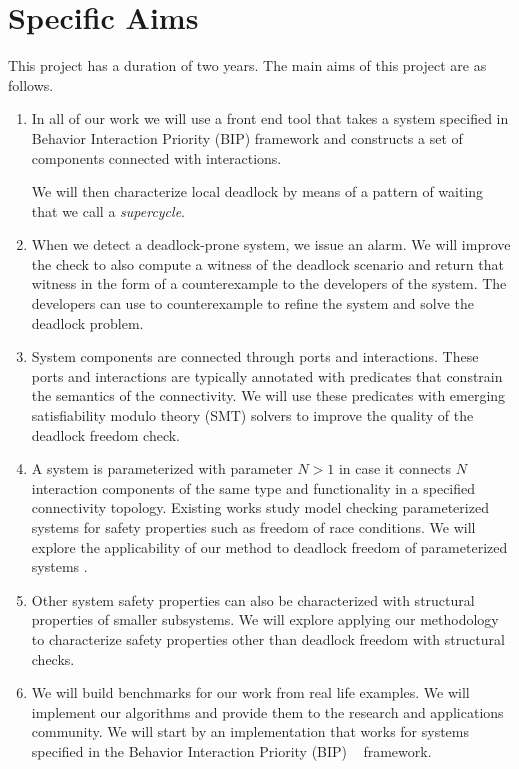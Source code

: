 \section{Specific Aims}
\label{sec:aims}

This project has a duration of two years.
The main aims of this project are as follows.

\begin{enumerate}

\item 
In all of our work we will use a front end tool that
takes a system specified in Behavior Interaction Priority (BIP)
framework and constructs a set of components connected 
with interactions. 



 We will then characterize local deadlock by
means of a pattern of waiting that we call a \emph{supercycle}.


\item 
When we detect a deadlock-prone system, we issue an alarm. 
We will improve the check to also compute a witness of the deadlock scenario 
and return that witness in the form of a counterexample 
to the developers of the system. 
The developers can use to counterexample to refine the system and solve
the deadlock problem. 

\item 
System components are connected through ports and interactions. 
These ports and interactions are typically annotated with predicates
that constrain the semantics of the connectivity. 
We will use these predicates with emerging satisfiability modulo theory (SMT) 
solvers to improve the quality of the deadlock freedom check.

		
\item 
A system is parameterized with parameter $N>1$ 
in case it connects $N$ interaction components of the 
same type and functionality in a specified connectivity topology. 
Existing works study model checking parameterized systems for safety properties
such as freedom of race conditions. 
We will explore the applicability of our method to deadlock freedom 
of parameterized systems
		. 

\item
Other system safety properties can also be characterized with structural 
properties of smaller subsystems. 
We will explore applying our methodology to characterize safety properties 
other than deadlock freedom with structural checks. 

\item 
We will build benchmarks for our work from real life examples.
We will implement our algorithms and provide them to the research and 
applications community. 
We will start by an implementation that works for systems specified in
the Behavior Interaction Priority (BIP) ~\cite{bip06} framework.

\end{enumerate}



